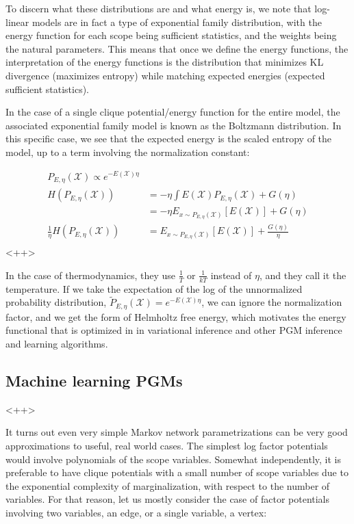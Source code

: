 \documentclass[a4paper]{article}
\begin{document}
To discern what these distributions are and what energy is, we note that log-linear models are in fact a type of exponential family distribution, with the energy function for each scope being sufficient statistics, and the weights being the natural parameters. 
This means that once we define the energy functions, the interpretation of the energy functions is the distribution that minimizes KL divergence (maximizes entropy) while matching expected energies (expected sufficient statistics).

In the case of a single clique potential/energy function for the entire model, the associated exponential family model is known as the Boltzmann distribution. 
In this specific case, we see that the expected energy is the scaled entropy of the model, up to a term involving the normalization constant:

\begin{equation}
  \begin{split}
    P_{E, \eta} (\mathcal{X}) \propto e^{- E(\mathcal{X}) \eta} \\
    H\left( P_{E, \eta} (\mathcal{X}) \right) &= - \eta \int E(\mathcal{X}) P_{E, \eta} (\mathcal{X}) + G(\eta) \\
    &= -\eta E_{ x \sim P_{E, \eta} (\mathcal{X}) } \left[ E(\mathcal{X}) \right] + G(\eta) \\
    \frac{1}{\eta} H\left( P_{E, \eta} (\mathcal{X})  \right) &= E_{ x \sim P_{E, \eta} (\mathcal{X}) } \left[ E(\mathcal{X}) \right] + \frac{G(\eta)}{\eta} \\
  \end{split}
  \label{<++>}
\end{equation}<++>

In the case of thermodynamics, they use $\frac{1}{T}$ or $\frac{1}{kT}$ instead of $\eta$, and they call it the temperature. 
If we take the expectation of the log of the unnormalized probability distribution, $ \tilde{P}_{E, \eta} (\mathcal{X}) = e^{- E(\mathcal{X}) \eta} $, we can ignore the normalization factor, and we get the form of Helmholtz free energy, which motivates the energy functional that is optimized in in variational inference and other PGM inference and learning algorithms. 

\subsection{Machine learning PGMs}<++>

It turns out even very simple Markov network parametrizations can be very good approximations to useful, real world cases. 
The simplest log factor potentials would involve polynomials of the scope variables. 
Somewhat independently, it is preferable to have clique potentials with a small number of scope variables due to the exponential complexity of marginalization, with respect to the number of variables. 
For that reason, let us mostly consider the case of factor potentials involving two variables, an edge, or a single variable, a vertex:
\end{document}
